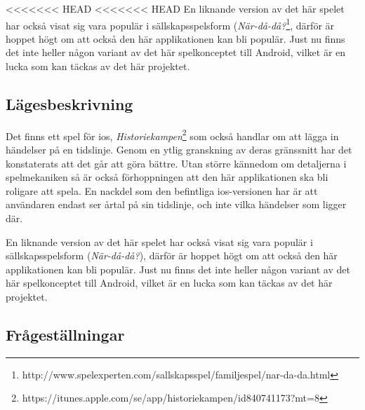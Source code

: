 \documentclass[swedish,12pt,a4paper]{article}
\begin{document}
<<<<<<< HEAD
<<<<<<< HEAD
En liknande version av det här spelet har också visat sig vara populär i sällskapsspelsform (\textit{När-då-då?}\footnote{http://www.spelexperten.com/sallskapsspel/familjespel/nar-da-da.html}, därför är hoppet högt om att också den här applikationen kan bli populär. Just nu finns det inte heller någon variant av det här spelkonceptet till Android, vilket är en lucka som kan täckas av det här projektet.

\subsection{Lägesbeskrivning}
Det finns ett spel för ios, \textit{Historiekampen}\footnote{https://itunes.apple.com/se/app/historiekampen/id840741173?mt=8} som också handlar om att lägga in händelser på en tidslinje. Genom en ytlig granskning av deras gränssnitt har det konstaterats att det går att göra bättre. Utan större kännedom om detaljerna i spelmekaniken så är också förhoppningen att den här applikationen ska bli roligare att spela. En nackdel som den befintliga ios-versionen har är att användaren endast ser årtal på sin tidslinje, och inte vilka händelser som ligger där.

En liknande version av det här spelet har också visat sig vara populär i sällskapsspelsform (\textit{När-då-då?})\cite{nardada}, därför är hoppet högt om att också den här applikationen kan bli populär. Just nu finns det inte heller någon variant av det här spelkonceptet till Android, vilket är en lucka som kan täckas av det här projektet.


\subsection{Frågeställningar}
\end{document}

